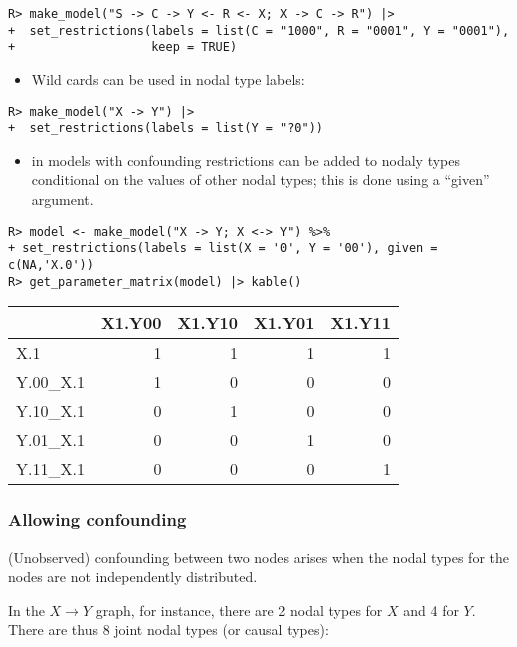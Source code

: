 \documentclass[
  11pt,
  article]{jss}
\providecommand{\tightlist}{%
  \setlength{\itemsep}{0pt}\setlength{\parskip}{0pt}}\usepackage{longtable,booktabs,array}
\begin{document}
\begin{verbatim}
R> make_model("S -> C -> Y <- R <- X; X -> C -> R") |>
+  set_restrictions(labels = list(C = "1000", R = "0001", Y = "0001"), 
+                   keep = TRUE)
\end{verbatim}

\begin{itemize}
\tightlist
\item
  Wild cards can be used in nodal type labels:
\end{itemize}

\begin{verbatim}
R> make_model("X -> Y") |>
+  set_restrictions(labels = list(Y = "?0"))
\end{verbatim}

\begin{itemize}
\tightlist
\item
  in models with confounding restrictions can be added to nodaly types
  conditional on the values of other nodal types; this is done using a
  ``given'' argument.
\end{itemize}

\begin{verbatim}
R> model <- make_model("X -> Y; X <-> Y") %>%
+ set_restrictions(labels = list(X = '0', Y = '00'), given = c(NA,'X.0'))
R> get_parameter_matrix(model) |> kable()
\end{verbatim}

\begin{tabular}{l|r|r|r|r}
\hline
  & X1.Y00 & X1.Y10 & X1.Y01 & X1.Y11\\
\hline
X.1 & 1 & 1 & 1 & 1\\
\hline
Y.00\_X.1 & 1 & 0 & 0 & 0\\
\hline
Y.10\_X.1 & 0 & 1 & 0 & 0\\
\hline
Y.01\_X.1 & 0 & 0 & 1 & 0\\
\hline
Y.11\_X.1 & 0 & 0 & 0 & 1\\
\hline
\end{tabular}

\hypertarget{confounding}{%
\subsubsection{Allowing confounding}\label{confounding}}

(Unobserved) confounding between two nodes arises when the nodal types
for the nodes are not independently distributed.

In the \(X \rightarrow Y\) graph, for instance, there are 2 nodal types
for \(X\) and 4 for \(Y\). There are thus 8 joint nodal types (or causal
types):
\end{document}
